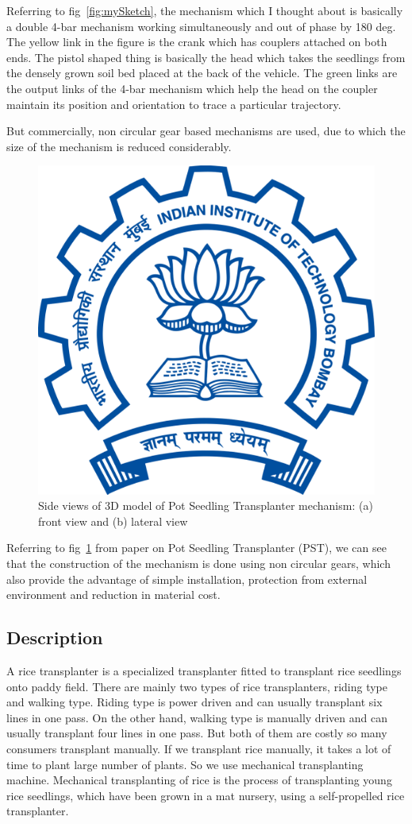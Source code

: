 \documentclass[a4paper,latin,center,onecolumn]{paper}
\begin{document}
            Referring to fig~\ref{fig:mySketch}, the mechanism which I thought about is basically a double 4-bar mechanism working simultaneously and out of phase by 180 deg. The yellow link in the figure is the crank which has couplers attached on both ends. The pistol shaped thing is basically the head which takes the seedlings from the densely grown soil bed placed at the back of the vehicle. The green links are the output links of the 4-bar mechanism which help the head on the coupler maintain its position and orientation to trace a particular trajectory. \par
            But commercially, non circular gear based mechanisms are used, due to which the size of the mechanism is reduced considerably. 
            \begin{figure}[hbt!]
                \centering
                \includegraphics[width=0.6\columnwidth]{Images/Indian_Institute_of_Technology_Bombay_Logo.png}
                \caption{Side views of 3D model of Pot Seedling Transplanter mechanism: (a) front view and (b) lateral view}
                \label{fig:refSketch}
            \end{figure}

            Referring to fig~\ref{fig:refSketch} from paper \cite{camPST} on Pot Seedling Transplanter (PST), we can see that the construction of the mechanism is done using non circular gears, which also provide the advantage of simple installation, protection from external environment and reduction in material cost.
        
        \subsection{Description}
            A rice transplanter is a specialized transplanter fitted to transplant rice seedlings onto paddy field. There are mainly two types of rice transplanters, riding type and walking type. Riding type is power driven and can usually transplant six lines in one pass. On the other hand, walking type is manually driven and can usually transplant four lines in one pass. But both of them are costly so many consumers transplant manually. If we transplant rice manually, it takes a lot of time to plant large number of plants. So we use mechanical transplanting machine. Mechanical transplanting of rice is the process of transplanting young rice seedlings, which have been grown in a mat nursery, using a self-propelled rice transplanter. \par
            
\end{document}
